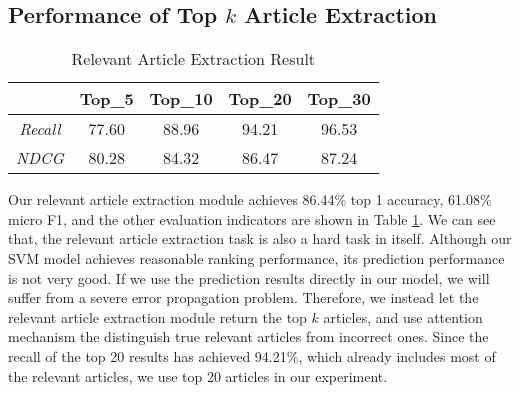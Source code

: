 \subsection{Performance of Top $k$ Article Extraction}
\begin{table}
\centering
\normalsize{
\begin{tabular}{|c|c|c|c|c|}
\hline
				& \textbf{Top\_5} 	& \textbf{Top\_10} 		& \textbf{Top\_20} 	& \textbf{Top\_30} \\
\hline
\textit{Recall} 		& 77.60			& 88.96  				& 94.21			& 96.53 	\\
\hline
\textit{NDCG} 		& 80.28			& 84.32  				& 86.47			& 87.24 	\\
\hline
\end{tabular}
}
\caption{Relevant Article Extraction Result}
\label{tab_article_extraction}
\end{table}

Our relevant article extraction module achieves 86.44\% top 1 accuracy, 61.08\% micro F1, and the other evaluation indicators are shown in Table \ref{tab_article_extraction}. We can see that, the relevant article extraction task is also a hard task in itself. Although our SVM model achieves reasonable ranking performance, its prediction performance is not very good. If we use the prediction results directly in our model, we will suffer from a severe error propagation problem. Therefore, we instead let the relevant article extraction module return the top $k$ articles, and use attention mechanism the distinguish true relevant articles from incorrect ones. Since the recall of the top 20 results has achieved 94.21\%, which already includes most of the relevant articles, we use top 20 articles in our experiment.

